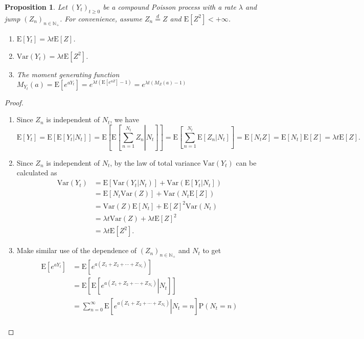 \documentclass{report}
\newtheorem{proposition}{Proposition}[section]
\theoremstyle{nonumberplain}
\newtheorem{proof}{Proof.}
\begin{document}
\begin{proposition}
	Let $(Y_t)_{t\ge 0}$ be a compound Poisson process with a rate $\lambda$ and jump $(Z_n)_{n\in \mathbb{N}_+}$. For convenience, assume $Z_n\overset{d}{=}Z$ and $\mathrm{E}[Z^2]<+\infty$.
	\begin{enumerate}
		\item $\mathrm{E}[Y_t]=\lambda t\mathrm{E}[Z]$.
		\item $\mathrm{Var}(Y_t)=\lambda t\mathrm{E}[Z^2]$.
		\item The moment generating function $M_{Y_t}(a)=\mathrm{E}[e^{aY_t}]=e^{\lambda t(\mathrm{E}[e^{aZ}]-1)}=e^{\lambda t(M_Z(a)-1)}$
	\end{enumerate}
\end{proposition}
\begin{proof}\hspace*{1em}	
\begin{enumerate}
	\item Since $Z_n$ is independent of $N_t$, we have $$\mathrm{E}[Y_t]=\mathrm{E}[\mathrm{E}[Y_t|N_t]]=\mathrm{E}\left[\mathrm{E}\left[\left.\sum _{n=1}^{N_t}Z_{n}\right|N_t\right]\right]=\mathrm{E}\left[\sum _{n=1}^{N_t}\mathrm{E}\left[\left.Z_{n}\right|N_t\right]\right]=\mathrm{E}[N_tZ]=\mathrm{E}[N_t]\mathrm{E}[Z]=\lambda t\mathrm{E}[Z].$$
	\item Since $Z_n$ is independent of $N_t$, by the law of total variance $\mathrm{Var}(Y_t)$ can be calculated as
	\begin{align*}
		\mathrm{Var}(Y_t)&=\mathrm{E}[\mathrm{Var}(Y_t|N_t)]+\mathrm{Var}(\mathrm{E}[Y_t|N_t])\\
		&=\mathrm{E}[N_t\mathrm{Var}(Z)]+\mathrm{Var}(N_t\mathrm{E}[Z])\\
		&=\mathrm{Var}(Z)\mathrm{E}[N_t]+\mathrm{E}[Z]^2\mathrm{Var}(N_t)\\
		&=\lambda t\mathrm{Var}(Z)+\lambda t\mathrm{E}[Z]^2\\
		&=\lambda t \mathrm{E}[Z^2].
	\end{align*}
	\item Make similar use of the dependence of $(Z_n)_{n\in\mathbb{N_+}}$ and $N_t$ to get
	\[
	\begin{aligned}
	\mathrm{E}\left[e^{aY_t}\right]&=\mathrm{E}\left[e^{a\left(Z_1+Z_2+\cdots+Z_{N_t}\right)}\right]\\
	&=\mathrm{E}\left[\mathrm{E}\left[\left.e^{a\left(Z_1+Z_2+\cdots+Z_{N_t}\right)}\right|N_t\right]\right]\\
	&=\sum_{n=0}^{\infty}\mathrm{E}\left[\left.e^{a\left(Z_1+Z_2+\cdots+Z_{N_t}\right)}\right|N_t=n\right]\mathrm{P}\left(N_t=n\right)\\

\end{aligned}\]
\end{enumerate}
\end{proof}
\end{document}

